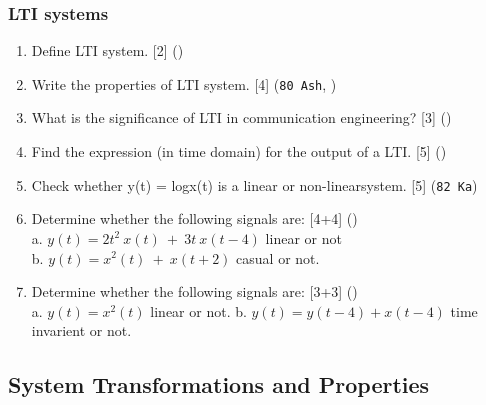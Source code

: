\documentclass[12pt]{article}
\begin{document}
    \subsubsection{LTI systems}
      \begin{enumerate}[topsep=0pt]
        \item Define LTI system. \hfill [2] ()

        \item Write the properties of LTI system. \hfill [4] (\texttt{80 Ash}, )

        \item What is the significance of LTI in communication engineering? \hfill [3] ()

        \item Find the expression (in time domain) for the output of a LTI. \hfill [5] ()

        \item Check whether y(t) = log{x(t)} is a linear or non-linearsystem. \hfill [5] (\texttt{82 Ka})

        \item Determine whether the following signals are: \hfill [4+4] ()\\
        a. $y(t) = 2t^2\ x(t)\ +\ 3t\ x(t-4)$ linear or not\\
        b. $y(t) = x^2(t)\ +\ x(t+2)$ casual or not.

        \item Determine whether the following signals are: \hfill [3+3] ()\\
        a. $y(t) = x^2 (t)$ linear or not.
        b. $y(t) = y(t-4) + x(t-4)$ time invarient or not.
      \end{enumerate}

  \subsection{System Transformations and Properties}
\end{document}
